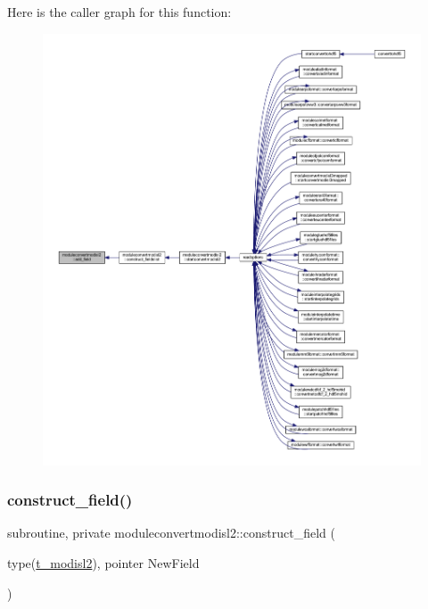 Here is the caller graph for this function\+:\nopagebreak
\begin{figure}[H]
\begin{center}
\leavevmode
\includegraphics[width=350pt]{namespacemoduleconvertmodisl2_a133fa594d1513ec9b6ed011f318d87e8_icgraph}
\end{center}
\end{figure}
\mbox{\label{namespacemoduleconvertmodisl2_a8eaadcf3a3d4a83e399eabd3c0502909}} 
\subsubsection{\texorpdfstring{construct\+\_\+field()}{construct\_field()}}
{\footnotesize\ttfamily subroutine, private moduleconvertmodisl2\+::construct\+\_\+field (\begin{DoxyParamCaption}\item[{type(\mbox{\hyperlink{structmoduleconvertmodisl2_1_1t__modisl2}{t\+\_\+modisl2}}), pointer}]{New\+Field }\end{DoxyParamCaption})\hspace{0.3cm}{\ttfamily [private]}}

